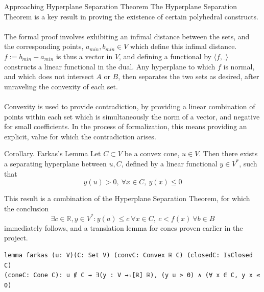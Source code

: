 \documentclass[final]{beamer}
\newlength{\colwidth}
\begin{document}
\begin{frame}[fragile]
\begin{columns}[t]
\begin{column}{\colwidth}
            \begin{block}{Approaching Hyperplane Separation Theorem}
                The Hyperplane Separation Theorem is a key result in proving the existence of certain polyhedral constructs.
                \\\\The formal proof involves exhibiting an infimal distance between the sets, and the corresponding points, $a_{min}, b_{min} \in V$ which define this infimal distance.
                $f:= b_{min}-a_{min}$ is thus a vector in $V$, and defining a functional by $\langle f, \_\rangle$ constructs a linear functional in the dual. Any hyperplane to which $f$
                is normal, and which does not intersect $A$ or $B$, then separates the two sets as desired, after unraveling the convexity of each set.
                \\\\Convexity is used to provide contradiction, by providing a linear combination of points within each set which is simultaneously the norm of a vector,
                and negative for small coefficients. In the process of formalization, this means providing an explicit, value for which the contradiction arises.         
            \end{block}
            
             
            \begin{exampleblock}{Corollary. Farkas's Lemma}
              Let $C \subset V$ be a convex cone, $u\in V$. Then there exists a separating hyperplane between $u, C$, defined by a linear functional $y \in V^*$, such that \begin{equation}
              y(u)> 0, \ \forall x\in C, \ y(x) \le 0
              \end{equation} 
            \end{exampleblock}
            \vspace{-1em}
            This result is  a combination of the Hyperplane Separation Theorem, for which the conclusion \begin{equation}
              \exists c\in \mathbb{R}, y \in V^*: y(a) \le c\ \forall x\in C, \ c < f(x)\ \forall b\in B
            \end{equation} immediately follows, and a translation lemma for cones proven earlier in the project.
\begin{Verbatim}
lemma farkas (u: V)(C: Set V) (convC: Convex ℝ C) (closedC: IsClosed C)
(coneC: Cone C): u ∉ C → ∃(y : V →ₗ[ℝ] ℝ), (y u > 0) ∧ (∀ x ∈ C, y x ≤ 0)
\end{Verbatim}  
           

\end{column}
\end{columns}
\end{frame}
\end{document}
